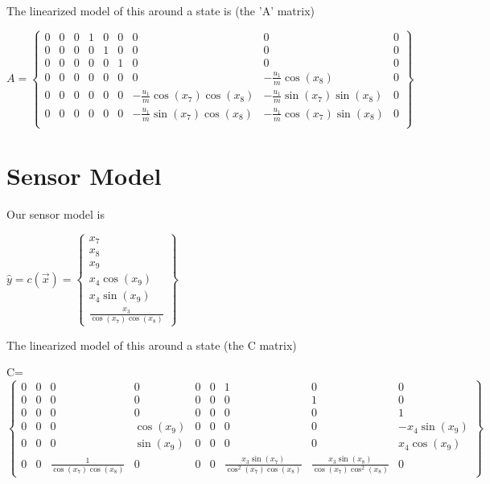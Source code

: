 \documentclass[12pt]{article}
\begin{document}
The linearized model of this around a state is (the 'A' matrix)
\begin{center}
$
A =
\begin{Bmatrix}
0 & 0 & 0 & 1 & 0 & 0 & 0 & 0 & 0\\
0 & 0 & 0 & 0 & 1 & 0 & 0 & 0 & 0\\
0 & 0 & 0 & 0 & 0 & 1 & 0 & 0 & 0\\
0 & 0 & 0 & 0 & 0 & 0 & 0 & -\frac{u_{1}}{m}\cos(x_8) & 0\\
0 & 0 & 0 & 0 & 0 & 0 & -\frac{u_{1}}{m}\cos(x_7)\cos(x_8) &
	-\frac{u_{1}}{m}\sin(x_7)\sin(x_8) & 0\\
0 & 0 & 0 & 0 & 0 & 0 & -\frac{u_{1}}{m}\sin(x_7)\cos(x_8) &
	-\frac{u_{1}}{m}\cos(x_7)\sin(x_8) & 0\\
\end{Bmatrix}
$

\end{center}

\section{Sensor Model}
Our sensor model is
\begin{center}
$
\hat{y} = c(\vec{x}) =
\begin{Bmatrix}
x_7 \\
x_8 \\
x_9 \\
x_4 \cos(x_9) \\
x_4 \sin(x_9) \\
\frac{x_3}{\cos(x_7)\cos(x_8)}
\end{Bmatrix}
$
\end{center}
The linearized model of this around a state (the C matrix)
\begin{center}
C=
$
\begin{Bmatrix}
0 & 0 & 0 & 0 & 0 & 0 & 1 & 0 & 0\\
0 & 0 & 0 & 0 & 0 & 0 & 0 & 1 & 0\\
0 & 0 & 0 & 0 & 0 & 0 & 0 & 0 & 1\\
0 & 0 & 0 & \cos(x_9) & 0 & 0 & 0 & 0 & -x_4\sin(x_9)\\
0 & 0 & 0 & \sin(x_9) & 0 & 0 & 0 & 0 & x_4\cos(x_9)\\
0 & 0 & \frac{1}{\cos(x_7)\cos(x_8)} & 0 & 0 & 0 &
	\frac{x_3\sin(x_7)}{\cos^2(x_7)\cos(x_8)} &
	\frac{x_3\sin(x_8)}{\cos(x_7)\cos^2(x_8)} & 0
\end{Bmatrix}
$

\end{center}
\end{document}
